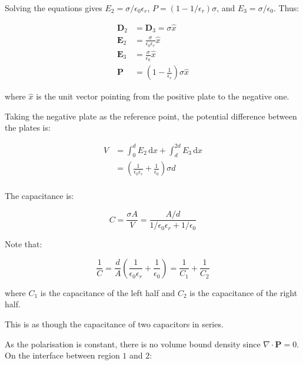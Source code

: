\documentclass[12pt]{article}
\begin{document}
Solving the equations gives $E_{2} = \sigma/\epsilon_{0} \epsilon_{r}$, $P = (1 - 1/\epsilon_{r}) \sigma$, and $E_{3} = \sigma/\epsilon_{0}$. Thus:

\begin{equation}
\begin{split}
    \mathbf{D}_{2} &= \mathbf{D}_{3} = \sigma \hat{x} \\
    \mathbf{E}_{2} &= \frac{\sigma}{\epsilon_{0} \epsilon_{r}} \hat{x} \\
    \mathbf{E}_{3} &= \frac{\sigma}{\epsilon_{0}} \hat{x} \\
    \mathbf{P} &= \left( 1 - \frac{1}{\epsilon_{r}} \right) \sigma \hat{x}
\end{split}
\end{equation}

where $\hat{x}$ is the unit vector pointing from the positive plate to the negative one.

Taking the negative plate as the reference point, the potential difference between the plates is:

\begin{equation}
\begin{split}
    V &= \int_{0}^{d} E_{2} \, \mathrm{d}x + \int_{d}^{2d} E_{3} \, \mathrm{d}x \\
    &= \left( \frac{1}{\epsilon_{0} \epsilon_{r}} + \frac{1}{\epsilon_{0}} \right) \sigma d \\
\end{split}
\end{equation}

The capacitance is:

\begin{equation}
    C = \frac{\sigma A}{V} = \frac{A/d}{1/\epsilon_{0} \epsilon_{r} + 1/\epsilon_{0}}
\end{equation}

Note that:

\begin{equation}
    \frac{1}{C} = \frac{d}{A} \left( \frac{1}{\epsilon_{0} \epsilon_{r}} + \frac{1}{\epsilon_{0}} \right) = \frac{1}{C_{1}} + \frac{1}{C_{2}}
\end{equation}

where $C_{1}$ is the capacitance of the left half and $C_{2}$ is the capacitance of the right half. 

This is as though the capacitance of two capacitors in series.

As the polarisation is constant, there is no volume bound density since $\nabla \cdot \mathbf{P} = 0$. On the interface between region $1$ and $2$:
\end{document}
